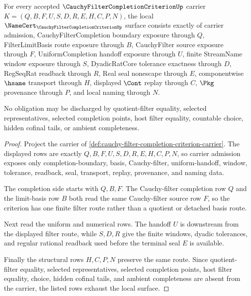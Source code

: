 \begin{theorem}
\label{thm:cauchy-filter-completion-criterion-namecert-obligations}
For every accepted $\CauchyFilterCompletionCriterionUp$ carrier $K=(Q,B,F,U,S,D,R,E,H,C,P,N)$, the local $\NameCert_{\CauchyFilterCompletionCriterionUp}$ surface consists exactly of carrier admission, CauchyFilterCompletion boundary exposure through $Q$, FilterLimitBasis route exposure through $B$, CauchyFilter source exposure through $F$, UniformCompletion handoff exposure through $U$, finite StreamName window exposure through $S$, DyadicRatCore tolerance exactness through $D$, RegSeqRat readback through $R$, Real seal nonescape through $E$, componentwise $\hsame$ transport through $H$, displayed $\Cont$ replay through $C$, $\Pkg$ provenance through $P$, and local naming through $N$.

No obligation may be discharged by quotient-filter equality, selected representatives, selected completion points, host filter equality, countable choice, hidden cofinal tails, or ambient completeness.
\end{theorem}
\begin{proof}
Project the carrier of \autoref{def:cauchy-filter-completion-criterion-carrier}. The displayed rows are exactly $Q,B,F,U,S,D,R,E,H,C,P,N$, so carrier admission exposes only completion-boundary, basis, Cauchy-filter, uniform-handoff, window, tolerance, readback, seal, transport, replay, provenance, and naming data.

The completion side starts with $Q,B,F$. The Cauchy-filter completion row $Q$ and the limit-basis row $B$ both read the same Cauchy-filter source row $F$, so the criterion has one finite filter route rather than a quotient or detached basis route.

Next read the uniform and numerical rows. The handoff $U$ is downstream from the displayed filter route, while $S,D,R$ give the finite windows, dyadic tolerances, and regular rational readback used before the terminal seal $E$ is available.

Finally the structural rows $H,C,P,N$ preserve the same route. Since quotient-filter equality, selected representatives, selected completion points, host filter equality, choice, hidden cofinal tails, and ambient completeness are absent from the carrier, the listed rows exhaust the local surface.
\end{proof}

